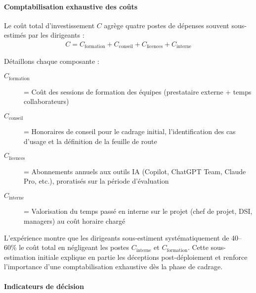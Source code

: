 \paragraph{Comptabilisation exhaustive des coûts}

Le coût total d'investissement $C$ agrège quatre postes de dépenses souvent sous-estimés par les dirigeants :
\begin{align}
C = C_{\text{formation}} + C_{\text{conseil}} + C_{\text{licences}} + C_{\text{interne}}
\end{align}

Détaillons chaque composante :
\begin{description}
    \item[$C_{\text{formation}}$] = Coût des sessions de formation des équipes (prestataire externe + temps collaborateurs)
    \item[$C_{\text{conseil}}$] = Honoraires de conseil pour le cadrage initial, l'identification des cas d'usage et la définition de la feuille de route
    \item[$C_{\text{licences}}$] = Abonnements annuels aux outils IA (Copilot, ChatGPT Team, Claude Pro, etc.), proratisés sur la période d'évaluation
    \item[$C_{\text{interne}}$] = Valorisation du temps passé en interne sur le projet (chef de projet, DSI, managers) au coût horaire chargé
\end{description}
\medskip
L'expérience montre que les dirigeants sous-estiment systématiquement de 40--60\% le coût total en négligeant les postes $C_{\text{interne}}$ et $C_{\text{formation}}$. Cette sous-estimation initiale explique en partie les déceptions post-déploiement et renforce l'importance d'une comptabilisation exhaustive dès la phase de cadrage.

\paragraph{Indicateurs de décision}

